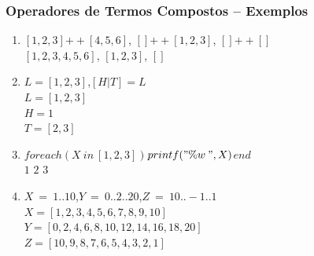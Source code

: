 \begin{frame}[fragile]
\frametitle{Operadores de Termos Compostos -- Exemplos}

    \begin{block}{}
		
        \begin{enumerate}
        
			\item $[1,2,3]$\:$++$\:$[4,5,6]$, \: $[]$\:$++$\:$[1,2,3]$, \: $[]$\:$++$\:$[]$\\
            \pause
            $[1,2,3,4,5,6]$, \:$[1,2,3]$, \:$[]$

            \pause
            \item $L = [1,2,3]$,\:\:$[H|T] = L$\\
            \pause
            $L = [1,2,3]$\\ \pause
            $H = 1$\\ \pause
            $T = [2,3]$
            
            \pause
            \item $foreach(X\:in\:[1,2,3])$\:\:$printf("\%w\:",X)$\:\:$end$\\
            \pause
            $1$ $2$ $3$

            \pause
            \item $X\:=\:1..10$,\:\:$Y\:=\:0..2..20$,\:\:$Z\:=\:10..-1..1$\\
            
            \pause
            $X = [1,2,3,4,5,6,7,8,9,10]$\\ 
            
            \pause
            $Y = [0,2,4,6,8,10,12,14,16,18,20]$\\
            \pause
            $Z = [10,9,8,7,6,5,4,3,2,1]$
            
		\end{enumerate}
        
	\end{block}
    
\end{frame}

